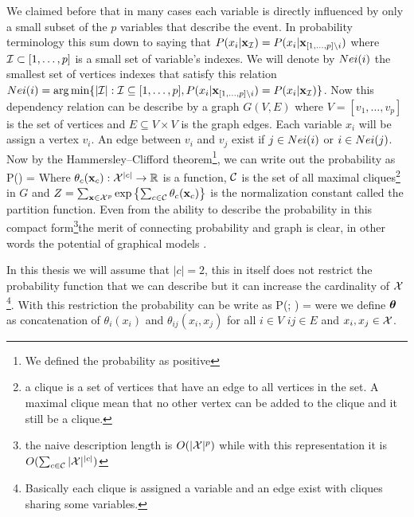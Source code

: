 We claimed before that in many cases each variable is directly influenced by only a small subset of the $p$ variables that describe the event.
In probability terminology this sum down to saying that $P(x_i |{\bf x}_{{\cal I}}) = P(x_i|{\bf x}_{[1,\ldots,p] \setminus i})$ where ${\cal I} \subset [1,\ldots,p]$  is a small set of variable's indexes.
We will denote by $Nei(i)$ the smallest set of vertices indexes that satisfy this relation $Nei(i) = \arg\min \{|{\cal I}| : {\cal I} \subseteq [1,\ldots,p], P(x_i|{\bf x}_{[1,\ldots,p] \setminus i}) = P(x_i |{\bf x}_{{\cal I}}) \}$.
Now this dependency relation can be describe by a graph $G(V,E)$ where $V = [v_1,\ldots, v_p]$ is the set of vertices and  $E \subseteq V \times V$ is the graph edges.
Each variable $x_i$ will be assign a vertex $v_i$. 
An edge between $v_i$ and $v_j$ exist if  $j \in Nei(i)$ or $ i \in Nei(j)$.
Now by the Hammersley–Clifford theorem\cite{hammersley1971markov}\footnote{We defined the probability as positive}, we can write out the probability as
\be
P(\xx) =  
\ee
Where $\theta_{c}({\bf x}_{c}): {\cal X}^{|c|} \to \mathbb{R}$  is a function, ${\cal C}$ is the set of all maximal cliques\footnote{a clique is a set of vertices that have an edge to all vertices in the set. A maximal clique mean that no other vertex can be added to the clique and it still be a clique.} in $G$ and $Z = \sum_{{\bf x} \in {\cal X}^p} {\mathrm{exp}}\left\{\sum_{c \in {\cal C}}\theta_{c}({\bf x}_{c})\right\}$ is the normalization constant called the partition function.
Even from the ability to describe the probability in this compact form\footnote{the naive description length is $O(|{\cal X}|^p)$ while with this representation it is $O(\sum_{c \in {\cal C}} |{\cal X}|^{|c|})$}the merit of connecting probability and graph is clear, in other words the potential of graphical models \cite{koller2009probabilistic}.


In this thesis we will assume that $|c| = 2$, this in itself does not restrict the probability function that we can describe but it can increase the cardinality of ${\cal X}$\footnote{Basically each clique is assigned a variable and an edge exist with cliques sharing some variables.}.
With this restriction the probability can be write as
\be
\label{eq:basic_model}
P(\xx; \thetav) =  
\ee
were we define $\boldsymbol{\theta}$ as concatenation of $\theta_i(x_i)$ and $\theta_{ij}(x_i,x_j)$ for all $i \in V$ $ij \in E$ and $x_i,x_j \in {\cal X}$.

